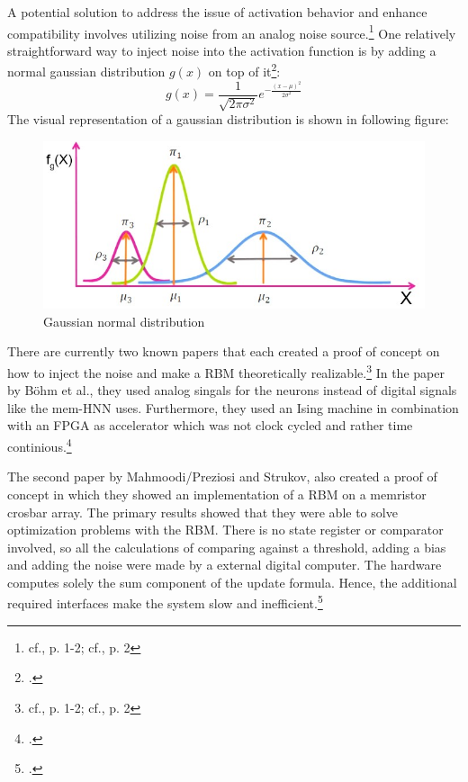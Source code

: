 A potential solution to address the issue of activation behavior and enhance compatibility involves utilizing noise from an analog noise source.\footnote{cf.\cite{bohmNoiseinjectedAnalogIsing2022}, p. 1-2; cf.\cite{mahmoodiVersatileStochasticDot2019}, p. 2}
One relatively straightforward way to inject noise into the activation function is by adding a normal gaussian distribution \(g(x)\) on top of it\footcite[cf.][3]{bohmNoiseinjectedAnalogIsing2022}:
\begin{equation}
    g(x) = \frac{1}{\sqrt{2\pi\sigma^2}} e^{-\frac{(x-\mu)^2}{2\sigma^2}}
\end{equation}
The visual representation of a gaussian distribution is shown in following figure:
\begin{figure}[H]
    \centering
    \includegraphics[width=0.65\linewidth]{graphics/Gaussian_Normal_Distribution_edited.jpg}
    \caption{Gaussian normal distribution\protect\footnotemark}
    \label{normalGaussianDistribution}
\end{figure}
There are currently two known papers that each created a proof of concept on how to inject the noise and make a \ac{RBM} theoretically realizable.\footnote{cf.\cite{bohmNoiseinjectedAnalogIsing2022}, p. 1-2; cf.\cite{mahmoodiVersatileStochasticDot2019}, p. 2}
In the paper by Böhm et al., they used analog singals for the neurons instead of digital signals like the \ac{mem-HNN} uses. 
Furthermore, they used an Ising machine in combination with an \ac{FPGA} as accelerator which was not clock cycled and rather time continious.\footcite[cf.][1-11]{bohmNoiseinjectedAnalogIsing2022}

The second paper by Mahmoodi/Preziosi and Strukov, also created a proof of concept in which they showed an implementation of a \ac{RBM} on a memristor crosbar array.
The primary results showed that they were able to solve optimization problems with the \ac{RBM}.
There is no state register or comparator involved, so all the calculations of comparing against a threshold, adding a bias and adding the noise were made by a external digital computer. 
The hardware computes solely the sum component of the update formula.
Hence, the additional required interfaces make the system slow and inefficient.\footcite[cf.][1-8]{mahmoodiVersatileStochasticDot2019}

